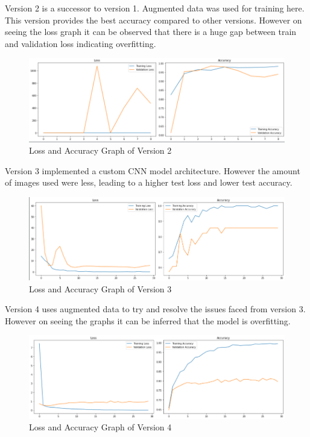 Version 2 is a successor to version 1. Augmented data was used for training here. This version provides the best accuracy compared to other versions. However on seeing the loss graph it can be observed that there is a huge gap between train and validation loss indicating overfitting.
\begin{figure}[H]
\includegraphics[scale=0.6]{Photos/v2.PNG}
\caption{Loss and Accuracy Graph of Version 2} \label{fig:ishan}
\end{figure}

Version 3 implemented a custom CNN model architecture. However the amount of images used were less, leading to a higher test loss and lower test accuracy.
\begin{figure}[H]
\includegraphics[scale=0.6]{Photos/v3.PNG}
\caption{Loss and Accuracy Graph of Version 3} \label{fig:ishan}
\end{figure}

Version 4 uses augmented data to try and resolve the issues faced from version 3. However on seeing the graphs it can be inferred that the model is overfitting.
\begin{figure}[H]
\includegraphics[scale=0.6]{Photos/v4.PNG}
\caption{Loss and Accuracy Graph of Version 4} \label{fig:ishan}
\end{figure}

